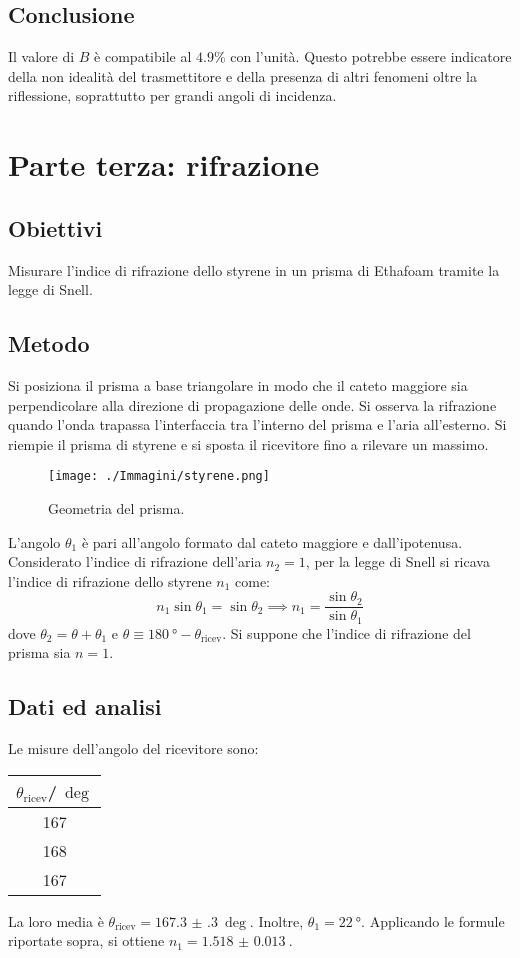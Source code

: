 \documentclass[a4paper]{article}
\begin{document}
\subsection{Conclusione}
Il valore di $B$ è compatibile al $4.9\%$ con l'unità. Questo potrebbe essere indicatore della non idealità del trasmettitore e della presenza di altri fenomeni oltre la riflessione, soprattutto per grandi angoli di incidenza.

\clearpage
\section{Parte terza: rifrazione}
\subsection{Obiettivi}
Misurare l'indice di rifrazione dello styrene in un prisma di Ethafoam tramite la legge di Snell.

\subsection{Metodo}
Si posiziona il prisma a base triangolare in modo che il cateto maggiore sia perpendicolare alla direzione di propagazione delle onde. Si osserva la rifrazione quando l'onda trapassa l'interfaccia tra l'interno del prisma e l'aria all'esterno. Si riempie il prisma di styrene e si sposta il ricevitore fino a rilevare un massimo.
\begin{figure}[h]
    \centering
    \texttt{[image: ./Immagini/styrene.png]}
    \caption[Prisma]{Geometria del prisma.}
\end{figure}
L'angolo $ \theta_1 $ è pari all'angolo formato dal cateto maggiore e dall'ipotenusa.\\
Considerato l'indice di rifrazione dell'aria $n_2=1$, per la legge di Snell si ricava l'indice di rifrazione dello styrene $n_1$ come:
\[
n_1 \sin \theta_1=\sin \theta_2 \implies n_1=\frac{\sin \theta_2}{\sin \theta_1}
\] 
dove $\theta_2=\theta+\theta_1$ e $\theta\equiv \SI{180}{\degree}-\theta_\text{ricev} $. Si suppone che l'indice di rifrazione del prisma sia $n=1$.

\subsection{Dati ed analisi}
Le misure dell'angolo del ricevitore sono:
\begin{center}
\begin{tabular}[h]{c}
	$\theta_\text{ricev} $/$\SI{}{\deg}$ \\\midrule
	\SI{167}{} \\
	\SI{168}{} \\
	\SI{167}{} \\
\end{tabular}
\end{center}
La loro media è $\theta_\text{ricev}=\SI{167.3(3)}{\deg}$. Inoltre, $\theta_1=\SI{22}{\degree}$. Applicando le formule riportate sopra, si ottiene $n_1 = \SI{1.518(13)}{}$.
\end{document}

